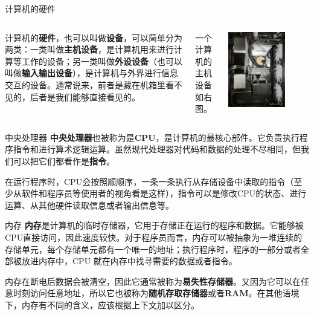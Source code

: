 \documentclass{beamer}
\begin{document}
\begin{frame}{计算机的硬件}
    \begin{columns}[T]
            计算机的\textbf{硬件}，也可以叫做\textbf{设备}，可以简单分为两类：一类叫做\textbf{主机设备}，是计算机用来进行计算等工作的设备；另一类叫做\textbf{外设设备}（也可以叫做\textbf{输入输出设备}），是计算机与外界进行信息交互的设备。通常说来，前者是藏在机箱里看不见的，后者是我们能够直接看见的。

            一个计算机的主机设备如右图。
        
            \includegraphics[width=0.7\textwidth]{1-2-Hardware.jpg}
    \end{columns}
\end{frame}

\begin{frame}{中央处理器}
    \textbf{中央处理器}也被称为是\textbf{CPU}，是计算机的最核心部件。它负责执行程序指令和进行算术逻辑运算。虽然现代处理器对代码和数据的处理不尽相同，但我们可以把它们都看作是\textbf{指令}。
    
    在运行程序时，CPU会按照顺顺序，一条一条执行从存储设备中读取的指令（至少从软件和程序员等使用者的视角看是这样），指令可以是修改CPU的状态、进行运算、从其他硬件读取信息或者输出信息等。
\end{frame}

\begin{frame}{内存}
    \textbf{内存}是计算机的临时存储器，它用于存储正在运行的程序和数据。它能够被CPU直接访问，因此速度较快。对于程序员而言，内存可以被抽象为一堆连续的存储单元，每个存储单元都有一个唯一的地址；执行程序时，程序的一部分或者全部被放进内存中，CPU 就在内存中找寻需要的数据或者指令。

    内存在断电后数据会被清空，因此它通常被称为\textbf{易失性存储器}。又因为它可以在任意时刻访问任意地址，所以它也被称为\textbf{随机存取存储器}或者\textbf{RAM}。在其他语境下，内存有不同的含义，应该根据上下文加以区分。
\end{frame}
\end{document}
